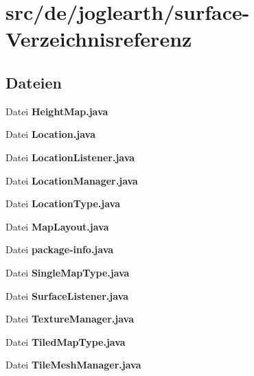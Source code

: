 \section{src/de/joglearth/surface-\/\-Verzeichnisreferenz}
\label{dir_bd6375927fdf4ab10a048231f7b8ce3b}
\subsection*{Dateien}
\begin{DoxyCompactItemize}
\item 
Datei {\bfseries Height\-Map.\-java}
\item 
Datei {\bfseries Location.\-java}
\item 
Datei {\bfseries Location\-Listener.\-java}
\item 
Datei {\bfseries Location\-Manager.\-java}
\item 
Datei {\bfseries Location\-Type.\-java}
\item 
Datei {\bfseries Map\-Layout.\-java}
\item 
Datei {\bfseries package-\/info.\-java}
\item 
Datei {\bfseries Single\-Map\-Type.\-java}
\item 
Datei {\bfseries Surface\-Listener.\-java}
\item 
Datei {\bfseries Texture\-Manager.\-java}
\item 
Datei {\bfseries Tiled\-Map\-Type.\-java}
\item 
Datei {\bfseries Tile\-Mesh\-Manager.\-java}
\end{DoxyCompactItemize}
